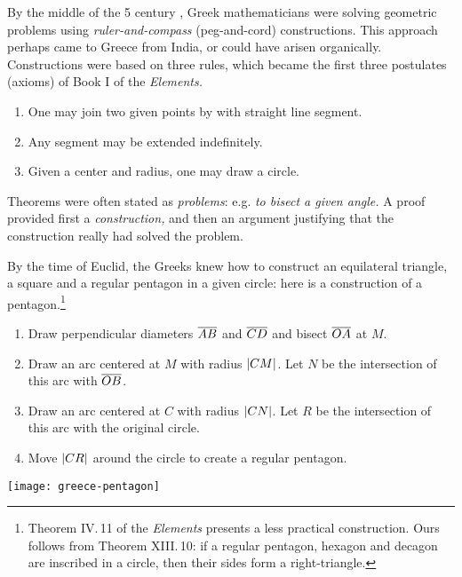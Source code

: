 By the middle of the 5\th{} century \!\BC, Greek mathematicians were solving geometric problems using \emph{ruler-and-compass} (peg-and-cord) constructions. This approach perhaps came to Greece from India, or could have arisen organically. Constructions were based on three rules, which became the first three postulates (axioms) of Book I of the \emph{Elements.}\vspace{-1pt}
\begin{enumerate}\itemsep0pt
  \item One may join two given points by with straight line segment.
  \item Any segment may be extended indefinitely.
  \item Given a center and radius, one may draw a circle.
\end{enumerate}\vspace{-1pt}
Theorems were often stated as \emph{problems}: e.g.{} \emph{to bisect a given angle.} A proof provided first a \emph{construction,} and then an argument justifying that the construction really had solved the problem.\smallbreak 

By the time of Euclid, the Greeks knew how to construct an equilateral triangle, a square and a regular pentagon in a given circle: here is a construction of a pentagon.\footnote{Theorem IV.\,11 of the \emph{Elements} presents a less practical construction. Ours follows from Theorem XIII.\,10: if a regular pentagon, hexagon and decagon are inscribed in a circle, then their sides form a right-triangle.}

\begin{minipage}[t]{0.69\linewidth}\vspace{-8pt}
\begin{enumerate}\itemsep0pt
  \item Draw perpendicular diameters $\overline{AB}$ and $\overline{CD}$ and bisect $\overline{OA}$ at $M$.
  \item Draw an arc centered at $M$ with radius $\left| CM\right|$. Let $N$ be the intersection of this arc with $\overline{OB}$.
  \item Draw an arc centered at $C$ with radius $\left| CN\right|$. Let $R$ be the intersection of this arc with the original circle.
	\item Move $\left| CR\right|$ around the circle to create a regular pentagon.
\end{enumerate}
\end{minipage}\hfill\begin{minipage}[t]{0.3\linewidth}\vspace{-22pt}
\flushright\texttt{[image: greece-pentagon]}
\end{minipage}\smallbreak


